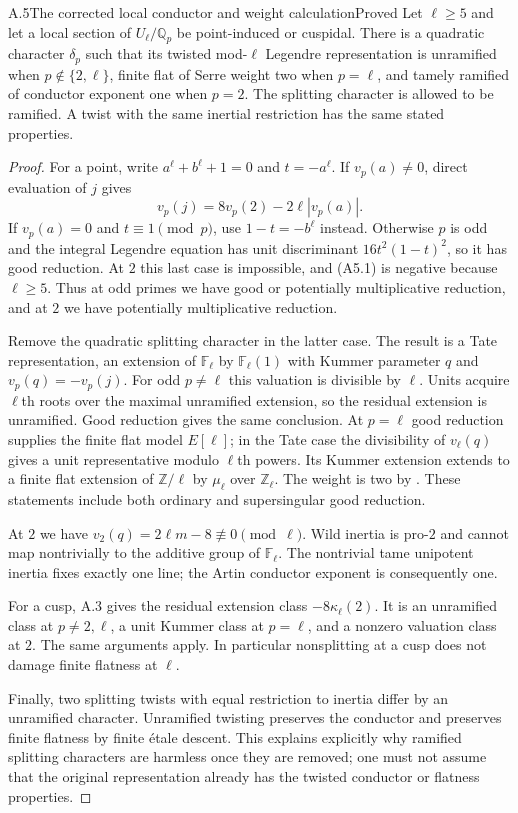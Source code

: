 \begin{statement}{A.5}{The corrected local conductor and weight calculation}{Proved}
Let $\ell\geq5$ and let a local section of $U_\ell/\mathbb Q_p$ be
point-induced or cuspidal. There is a quadratic character $\delta_p$ such
that its twisted mod-$\ell$ Legendre representation is unramified when
$p\notin\{2,\ell\}$, finite flat of Serre weight two when $p=\ell$, and
tamely ramified of conductor exponent one when $p=2$. The splitting
character is allowed to be ramified. A twist with the same inertial
restriction has the same stated properties.
\end{statement}
\begin{proof}
For a point, write $a^\ell+b^\ell+1=0$ and $t=-a^\ell$.
If $v_p(a)\ne0$, direct evaluation of $j$ gives
\[
 v_p(j)=8v_p(2)-2\ell|v_p(a)|.
 \tag{A5.1}
\]
If $v_p(a)=0$ and $t\equiv1\pmod p$, use $1-t=-b^\ell$ instead.
Otherwise $p$ is odd and the integral Legendre equation has unit
discriminant $16t^2(1-t)^2$, so it has good reduction. At $2$ this last
case is impossible, and (A5.1) is negative because $\ell\geq5$.
Thus at odd primes we have good or potentially multiplicative reduction,
and at $2$ we have potentially multiplicative reduction.

Remove the quadratic splitting character in the latter case. The result
is a Tate representation, an extension of $\mathbb F_\ell$ by
$\mathbb F_\ell(1)$ with Kummer parameter $q$ and
$v_p(q)=-v_p(j)$. For odd $p\ne\ell$ this valuation is divisible by
$\ell$. Units acquire $\ell$th roots over the maximal unramified extension,
so the residual extension is unramified. Good reduction gives the same
conclusion. At $p=\ell$ good reduction supplies the finite flat model
$E[\ell]$; in the Tate case the divisibility of $v_\ell(q)$ gives a unit
representative modulo $\ell$th powers. Its Kummer extension extends to a
finite flat extension of $\mathbb Z/\ell$ by $\mu_\ell$ over
$\mathbb Z_\ell$. The weight is two by \citet[Propositions 4--5,
\S\S2.8--2.9]{AMSerre1987}. These statements include both ordinary and
supersingular good reduction.

At $2$ we have $v_2(q)=2\ell m-8\not\equiv0\pmod\ell$. Wild inertia
is pro-$2$ and cannot map nontrivially to the additive group of
$\mathbb F_\ell$. The nontrivial tame unipotent inertia fixes exactly one
line; the Artin conductor exponent is consequently one.

For a cusp, A.3 gives the residual extension class
$-8\kappa_\ell(2)$. It is an unramified class at $p\ne2,\ell$, a unit
Kummer class at $p=\ell$, and a nonzero valuation class at $2$. The same
arguments apply. In particular nonsplitting at a cusp does not damage
finite flatness at $\ell$.

Finally, two splitting twists with equal restriction to inertia differ by
an unramified character. Unramified twisting preserves the conductor and
preserves finite flatness by finite \'etale descent. This explains explicitly
why ramified splitting characters are harmless once they are removed;
one must not assume that the original representation already has the
twisted conductor or flatness properties.
\end{proof}

